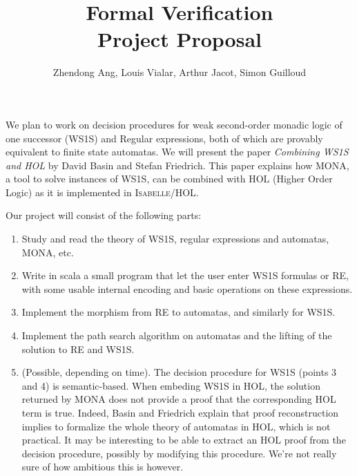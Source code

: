 \documentclass[12pt,a4paper]{article}
\begin{document}
\title{Formal Verification \\ Project Proposal}
\author{Zhendong Ang, Louis Vialar, Arthur Jacot, Simon Guilloud}
\maketitle
We plan to work on decision procedures for weak second-order monadic logic of one successor (WS1S) and Regular expressions, both of which are provably equivalent to finite state automatas. We will present the paper \textit{Combining WS1S and HOL} by David Basin and Stefan Friedrich. This paper explains how MONA, a tool to solve instances of WS1S, can be combined with HOL (Higher Order Logic) as it is implemented in I\textsc{sabelle}/HOL.

Our project will consist of the following parts:
\begin{enumerate}
\item Study and read the theory of WS1S, regular expressions and automatas, MONA, etc.

\item Write in scala a small program that let the user enter WS1S formulas or RE, with some usable internal encoding and basic operations on these expressions.

\item Implement the morphism from RE to automatas, and similarly for WS1S.

\item Implement the path search algorithm on automatas and the lifting of the solution to RE and WS1S.

\item (Possible, depending on time). The decision procedure for WS1S (points 3 and 4) is semantic-based. When embeding WS1S in HOL, the solution returned by MONA does not provide a proof that the corresponding HOL term is true. Indeed, Basin and Friedrich explain that proof reconstruction implies to formalize the whole theory of automatas in HOL, which is not practical. It may be interesting to be able to extract an HOL proof from the decision procedure, possibly by modifying this procedure. We're not really sure of how ambitious this is however.
\end{enumerate}
\end{document}
